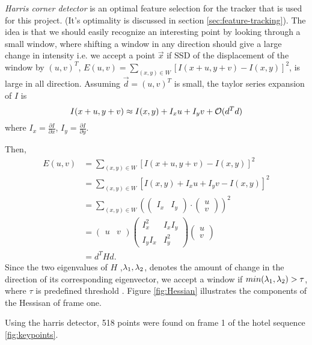 \emph{Harris corner detector} is an optimal feature selection for the
tracker that is used for this project. (It's optimality is discussed
in section \ref{sec:feature-tracking}). The idea is that we should easily recognize an interesting point by looking through a
small window, where shifting a window in any direction
should give a large change in intensity i.e. we accept a point $\vec x$ if SSD of
the displacement of the window by $(u,v)^T$, $E(u,v) =
\sum_{(x,y)\in W} [I(x+u, y+v) - I(x,y)]^2$, is large in all
direction. 
Assuming $\vec d = (u,v)^T$ is small, the taylor series expansion of $I$ is
$$I(x+u, y+v) \approx I(x,y) + I_xu +I_yv + \mathcal{O}(d^Td)$$ where $I_x
=\frac{\partial I}{\partial x} $, $I_y = \frac{\partial I}{\partial y}$.

Then, 
\begin{align*}
  E(u,v) &=\sum_{(x,y)\in W} [I(x+u, y+v) - I(x,y)]^2\\
&=\sum_{(x,y)\in W} [I(x,y) + I_xu +
I_yv - I(x,y)]^2\\
&= \sum_{(x,y)\in W} (
\begin{pmatrix}
  I_x & I_y
\end{pmatrix}
\cdot
\begin{pmatrix}
  u \\ v
\end{pmatrix}
)^2\\
&= \begin{pmatrix}
  u & v
\end{pmatrix} 
\begin{pmatrix}  I_x^2
  & I_xI_y \\ I_yI_x & I_y^2\end{pmatrix} \begin{pmatrix}
  u \\ v
\end{pmatrix}\\
&=d^T H d.
\end{align*}
  Since the two eigenvalues of $H$
,$\lambda_1, \lambda_2$, denotes the amount of change in the direction of its corresponding
eigenvector, we accept a window if $min(\lambda_1, \lambda_2) > \tau$, where
$\tau$ is predefined threshold \cite{shi}. Figure \ref{fig:Hessian} illustrates
the components of the Hessisan of frame one. 

Using the harris detector, 518 points were found on frame 1 of the hotel
sequence \ref{fig:keypoints}.

